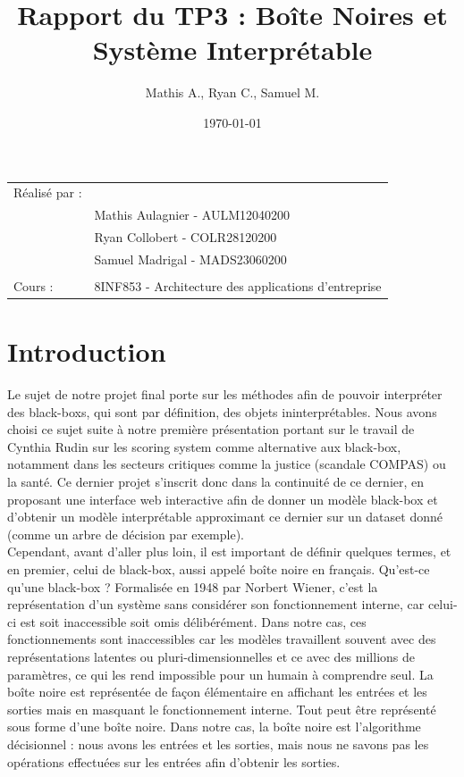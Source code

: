 \documentclass{article}
\title{Rapport du TP3 : Boîte Noires et Système Interprétable}
\author{Mathis A., Ryan C., Samuel M.}
\date{\today}
\begin{document}
\maketitle
\noindent\begin{tabular}{@{}ll}
    Réalisé par :\\
        & Mathis Aulagnier - AULM12040200 \\
        & Ryan Collobert - COLR28120200 \\
        & Samuel Madrigal - MADS23060200 \\
        \\
    Cours :  &  8INF853 - Architecture des applications d'entreprise \\
\end{tabular}

\tableofcontents

\clearpage

\section{Introduction}

\quad Le sujet de notre projet final porte sur les méthodes afin de pouvoir interpréter des black-boxs, qui sont par définition, des objets ininterprétables. Nous avons choisi ce sujet suite à notre première présentation portant sur le travail de Cynthia Rudin sur les scoring system comme alternative aux black-box, notamment dans les secteurs critiques comme la justice (scandale COMPAS) ou la santé. Ce dernier projet s’inscrit donc dans la continuité de ce dernier, en proposant une interface web interactive afin de donner un modèle black-box et d’obtenir un modèle interprétable approximant ce dernier sur un dataset donné (comme un arbre de décision par exemple).\\

Cependant, avant d’aller plus loin, il est important de définir quelques termes, et en premier, celui de black-box, aussi appelé boîte noire en français. Qu’est-ce qu’une black-box ? Formalisée en 1948 par Norbert Wiener, c’est la représentation d'un système sans considérer son fonctionnement interne, car celui-ci est soit inaccessible soit omis délibérément. Dans notre cas, ces fonctionnements sont inaccessibles car les modèles travaillent souvent avec des représentations latentes ou pluri-dimensionnelles et ce avec des millions de paramètres, ce qui les rend impossible pour un humain à comprendre seul. La boîte noire est représentée de façon élémentaire en affichant les entrées et les sorties mais en masquant le fonctionnement interne. Tout peut être représenté sous forme d'une boîte noire. Dans notre cas, la boîte noire est l’algorithme décisionnel : nous avons les entrées et les sorties, mais nous ne savons pas les opérations effectuées sur les entrées afin d’obtenir les sorties.\\
\end{document}
